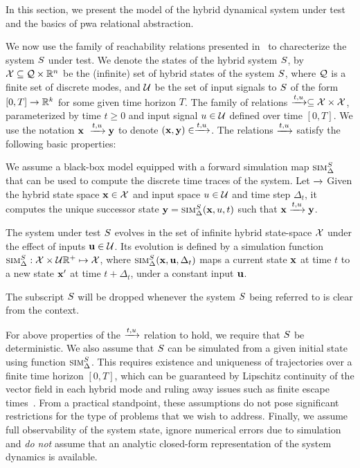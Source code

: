 In this section, we present the model of the hybrid dynamical system
under test and the basics of pwa relational abstraction.

We now use the family of reachability relations presented
in~\cite{zutshi2014multiple} to charecterize the system $S$
under test. We denote the states of the hybrid system $S$, by $\mathcal{X} \subseteq \mathcal{Q} \times \mathbb{R}^n$ be the (infinite)
set of hybrid states of the system $S$, where $\mathcal{Q}$ is a
finite set of discrete modes, and $\mathcal{U}$ be the set of input
signals to $S$ of the form $[0,T] \rightarrow \mathbb{R}^k$ for some
given time horizon $T$. The family of
relations $\xrightarrow{t,u} \subseteq \mathcal{X} \times \mathcal{X}$,
parameterized by time $t \geq 0$ and input signal $u \in \mathcal{U}$
defined over time $[0,T]$.  We use the notation $\mathbf{x}\ \xrightarrow{t,u} \mathbf{y}$
to denote $(\mathbf{x},\mathbf{y}) \in \xrightarrow{t,u}$. The relations $\xrightarrow{t,u}$
satisfy the following basic properties:


We assume a black-box model
equipped with a forward simulation map $\mbox{\sc sim}_\Delta^{S}$ that can
be used to compute the discrete time traces of the system. Let
$\xrightarrow{}$ Given the
hybrid state space $\mathbf{x}\in\mathcal{X}$ and input space $u
\in\mathcal{U}$ and time step $\Delta_t$, it computes the unique successor
state $\mathbf{y}=\mbox{\sc sim}_\Delta^{S}(\mathbf{x},u,t)$ such that $\mathbf{x} \xrightarrow{t,u}
\mathbf{y}$.

\begin{definition}

    The system under test $S$ evolves in the set of infinite
    hybrid state-space $\mathcal{X}$ under the effect of inputs $\mathbf{u}
    \in \mathcal{U}$. Its evolution is defined by a simulation function
    $\mbox{\sc sim}_\Delta^{S} : \mathcal{X} \times \mathcal{U} \mathbb{R}^+ \mapsto
    \mathcal{X}$, where $\mbox{\sc sim}_\Delta^{S}(\mathbf{x},\mathbf{u},\Delta_t)$ maps a
    current state $\mathbf{x}$ at time $t$ to a new state $\mathbf{x}'$ at time
    $t+\Delta_t$, under a constant input $\mathbf{u}$.

\end{definition}

The subscript $S$ will be dropped whenever the system $S$
being referred to is clear from the context.


 For above properties of the
$\xrightarrow{t,u}$ relation to hold, we require that $S$ be
deterministic. We also assume that $S$ can be simulated from a
given initial state using function $\mbox{\sc sim}_\Delta^{S}$. This
requires existence and uniqueness of trajectories over a finite time
horizon $[0,T]$, which can be guaranteed by Lipschitz continuity of
the vector field in each hybrid mode and ruling away issues such as
finite escape times~\cite{Meiss/2007/Differential}. From a practical
standpoint, these assumptions do not pose significant restrictions for
the type of problems that we wish to address.  Finally, we assume full
observability of the system state, ignore numerical errors due to
simulation and {\em do not} assume that an analytic closed-form
representation of the system dynamics is available.

